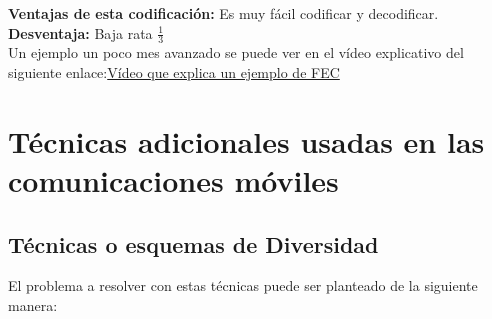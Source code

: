 \vspace{200px}
	\begin{table}[h!]
	\captionsetup{justification = raggedright,singlelinecheck = false}
	\caption{Alguna descripción.}
	\label{tabla:tabla11}
	\centering
\end{table}

\textbf{Ventajas de esta codificación:} Es muy fácil codificar y decodificar.\\

\textbf{Desventaja:} Baja rata $ \frac{1}{3} $\\

Un ejemplo un poco mes avanzado se puede ver en el vídeo explicativo del siguiente enlace:\textcolor{blue}{\href{https://www.youtube.com/watch?v=0CLTy231Hsw}{Vídeo que explica un ejemplo de FEC}}

\section{Técnicas adicionales usadas en las comunicaciones móviles}

\subsection{Técnicas o esquemas de Diversidad}

El problema a resolver con estas técnicas puede ser planteado de la siguiente manera: \\

